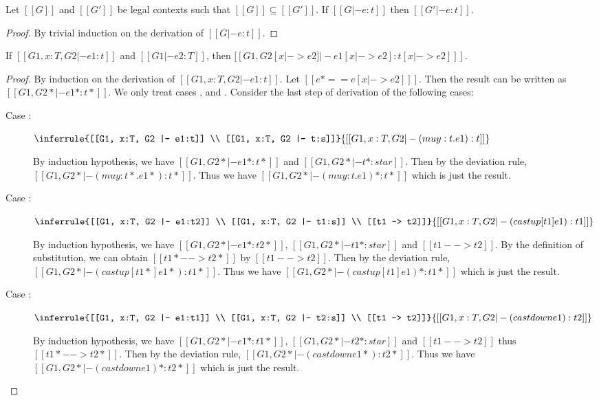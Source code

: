 \begin{lem}[Thinning]\label{lem:appendix:thin}
    Let $[[G]]$ and $[[G']]$ be legal contexts such that $[[G]] \subseteq
[[G']]$. If $[[G |- e : t]]$ then $[[G' |- e : t]]$.
\end{lem}

\begin{proof}
    By trivial induction on the derivation of $[[G |- e : t]]$.
\end{proof}

\begin{lem}[Substitution]\label{lem:appendix:subst}
	If $[[G1, x:T, G2 |- e1:t]]$ and $[[G1 |- e2:T]]$, then $[[G1, G2 [x |-> e2]
|- e1[x |-> e2]  : t[x |-> e2] ]]$.
\end{lem}

\begin{proof}
    By induction on the derivation of $[[G1, x:T, G2 |- e1:t]]$. Let $[[e* == e
[x |-> e2] ]]$. Then the result can be written as $[[G1, G2* |- e1*  : t* ]]$.
We only treat cases ,  and
. Consider the last step of derivation of the following
cases:
    \begin{description}
        \item[Case :] $\inferrule{[[G1, x:T, G2 |- e1:t]] \\
[[G1, x:T, G2 |- t:s]]}{[[G1, x:T, G2 |- (mu y:t.e1): t]]}$ 
        
        By induction hypothesis, we have $[[G1, G2* |- e1* : t*]]$ and $[[G1,
G2* |- t* : star]]$. Then by the deviation rule, $[[G1, G2* |- (mu
y:t*.e1*):t*]]$. Thus we have $[[G1, G2* |- (mu y:t.e1)*:t*]]$ which is just
the result.
        \item[Case :] $\inferrule{[[G1, x:T, G2 |- e1:t2]]
\\ [[G1, x:T, G2 |- t1:s]] \\ [[t1 --> t2]]}{[[G1, x:T, G2 |- (castup [t1]
e1):t1]]}$ 
        
        By induction hypothesis, we have $[[G1, G2* |- e1*:t2*]]$, $[[G1, G2*
|- t1*:star]]$ and $[[t1 --> t2]]$. By the definition of substitution, we can
obtain $[[t1* --> t2*]]$ by $[[t1 --> t2]]$. Then by the deviation rule, $[[G1,
G2* |- (castup [t1*] e1*):t1*]]$. Thus we have $[[G1, G2* |- (castup [t1]
e1)*:t1*]]$ which is just the result.
        \item[Case :] $\inferrule{[[G1, x:T, G2 |- e1:t1]]
\\ [[G1, x:T, G2 |- t2:s]] \\ [[t1 --> t2]]}{[[G1, x:T, G2 |- (castdown
e1):t2]]}$ 
        
        By induction hypothesis, we have $[[G1, G2* |- e1*:t1*]]$, $[[G1, G2*
|- t2*:star]]$ and $[[t1 --> t2]]$ thus $[[t1* --> t2*]]$. Then by the
deviation rule, $[[G1, G2* |- (castdown e1*):t2*]]$. Thus we have $[[G1, G2* |-
(castdown e1)*:t2*]]$ which is just the result.
    \end{description}
\end{proof}

